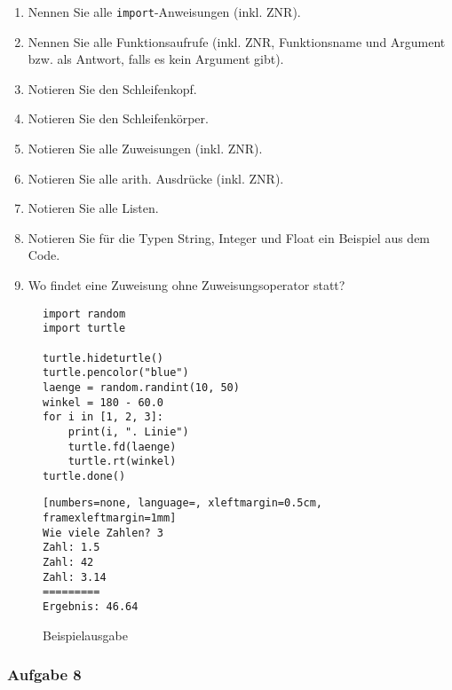 \begin{enumerate}
\item Nennen Sie alle \lstinline{import}-Anweisungen (inkl. \ac{ZNR}).
\item Nennen Sie alle Funktionsaufrufe (inkl. \ac{ZNR}, Funktionsname und Argument bzw.  als Antwort, falls es kein Argument gibt).
\item Notieren Sie den Schleifenkopf.
\item Notieren Sie den Schleifenkörper.
\item Notieren Sie alle Zuweisungen (inkl. \ac{ZNR}).
\item Notieren Sie alle arith. Ausdrücke (inkl. \ac{ZNR}).
\item Notieren Sie alle Listen.
\item Notieren Sie für die Typen String, Integer und Float ein Beispiel aus dem Code.
\item Wo findet eine Zuweisung ohne Zuweisungsoperator statt?
\end{enumerate}

\begin{figure}[htb]
\centering
\begin{minipage}[c]{0.55\linewidth}
\centering
\begin{lstlisting}[caption={Python-Code}, label=lst-analyse-typen, showstringspaces=false]
import random
import turtle

turtle.hideturtle()
turtle.pencolor("blue")
laenge = random.randint(10, 50)
winkel = 180 - 60.0
for i in [1, 2, 3]:
    print(i, ". Linie")
    turtle.fd(laenge)
    turtle.rt(winkel)
turtle.done()
\end{lstlisting}
\end{minipage}
\hfill
\begin{minipage}[c]{0.4\linewidth}
\centering
\vspace{2cm}
\begin{lstlisting}[numbers=none, language=, xleftmargin=0.5cm, framexleftmargin=1mm]
Wie viele Zahlen? 3
Zahl: 1.5
Zahl: 42
Zahl: 3.14
=========
Ergebnis: 46.64
\end{lstlisting}
\caption{Beispielausgabe}
\label{lst-addierer-output}
\end{minipage}
\end{figure}

\subsubsection{Aufgabe 8}

